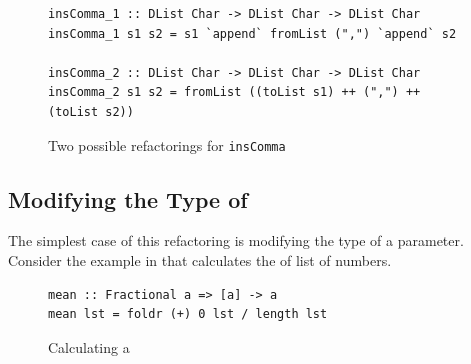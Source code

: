 \begin{figure}[t]
\begin{lstlisting}
insComma_1 :: DList Char -> DList Char -> DList Char
insComma_1 s1 s2 = s1 `append` fromList (",") `append` s2

insComma_2 :: DList Char -> DList Char -> DList Char
insComma_2 s1 s2 = fromList ((toList s1) ++ (",") ++ (toList s2))
\end{lstlisting}
\caption{Two possible refactorings for \texttt{insComma}}
\label{commaRef}
\end{figure}

\subsection{Modifying the Type of \DIFdelbegin {}\DIFdelend \DIFaddbegin {}\DIFaddend }

The simplest case of this refactoring is modifying the type of a parameter. Consider the example in \DIFdelbegin {}\DIFdelend \DIFaddbegin {}\DIFaddend that calculates the \DIFdelbegin {}\DIFdelend \DIFaddbegin {}\DIFaddend of list of numbers. 

\begin{figure}[t]
\DIFdelbeginFL %
\DIFdelendFL \DIFaddbeginFL \begin{lstlisting}
mean :: Fractional a => [a] -> a
mean lst = foldr (+) 0 lst / length lst
\end{lstlisting} 
\DIFaddendFL \caption{Calculating \DIFaddbeginFL {}\DIFaddendFL a \DIFdelbeginFL {}\DIFdelendFL \DIFaddbeginFL {}\DIFaddendFL }
\DIFdelbeginFL %
\DIFdelendFL \DIFaddbeginFL \label{mean}
\DIFaddendFL \end{figure}

